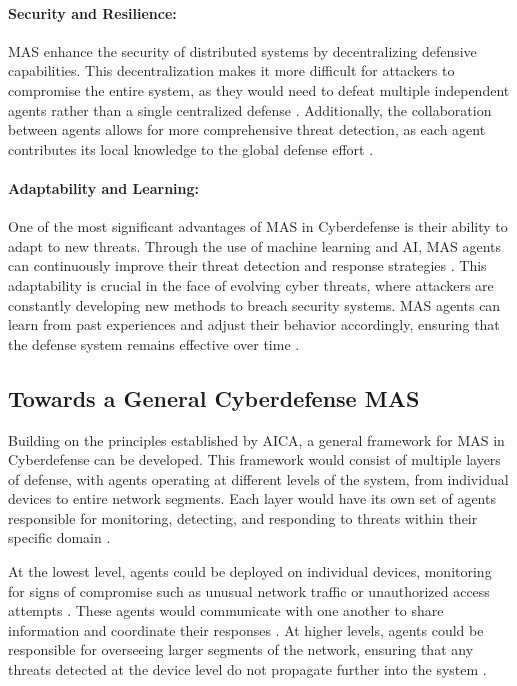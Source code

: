 \paragraph{Security and Resilience:}
MAS enhance the security of distributed systems by decentralizing defensive capabilities. This decentralization makes it more difficult for attackers to compromise the entire system, as they would need to defeat multiple independent agents rather than a single centralized defense \cite{jajodia2005topological}. Additionally, the collaboration between agents allows for more comprehensive threat detection, as each agent contributes its local knowledge to the global defense effort \cite{buczak2016survey}.

\paragraph{Adaptability and Learning:}
One of the most significant advantages of MAS in Cyberdefense is their ability to adapt to new threats. Through the use of machine learning and AI, MAS agents can continuously improve their threat detection and response strategies \cite{buczak2016survey}. This adaptability is crucial in the face of evolving cyber threats, where attackers are constantly developing new methods to breach security systems. MAS agents can learn from past experiences and adjust their behavior accordingly, ensuring that the defense system remains effective over time \cite{debar1999towards}.

\subsection{Towards a General Cyberdefense MAS}

Building on the principles established by AICA, a general framework for MAS in Cyberdefense can be developed. This framework would consist of multiple layers of defense, with agents operating at different levels of the system, from individual devices to entire network segments. Each layer would have its own set of agents responsible for monitoring, detecting, and responding to threats within their specific domain \cite{bou-harb2017cyber}.

At the lowest level, agents could be deployed on individual devices, monitoring for signs of compromise such as unusual network traffic or unauthorized access attempts \cite{kolias2011swarm}. These agents would communicate with one another to share information and coordinate their responses \cite{shamshirband2018computational}. At higher levels, agents could be responsible for overseeing larger segments of the network, ensuring that any threats detected at the device level do not propagate further into the system \cite{hu2018mimic}.

